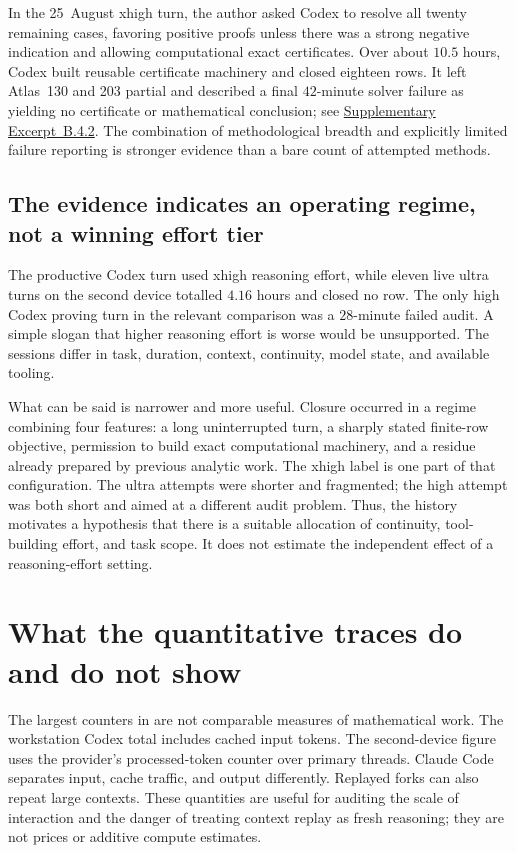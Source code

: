 \documentclass[11pt]{article}
\newcommand{\excerptlink}[2]{\hyperref[ex:#1]{Supplementary Excerpt~#2}}
\begin{document}
In the 25~August xhigh turn, the author asked Codex to resolve all twenty
remaining cases, favoring positive proofs unless there was a strong negative
indication and allowing computational exact certificates.  Over about
$10.5$ hours, Codex built reusable certificate machinery and closed eighteen
rows.  It left Atlas~130 and 203 partial and described a final $42$-minute
solver failure as yielding no certificate or mathematical conclusion; see
\excerptlink{B42}{B.4.2}.  The combination of methodological breadth and
explicitly limited failure reporting is stronger evidence than a bare count
of attempted methods.

\subsection{The evidence indicates an operating regime, not a winning effort tier}
\label{sec:effort}

The productive Codex turn used xhigh reasoning effort, while eleven live ultra
turns on the second device totalled $4.16$ hours and closed no row.  The only
high Codex proving turn in the relevant comparison was a $28$-minute failed
audit.  A simple slogan that higher reasoning effort is worse would be
unsupported.  The sessions differ in task, duration, context, continuity,
model state, and available tooling.

What can be said is narrower and more useful.  Closure occurred in a regime
combining four features: a long uninterrupted turn, a sharply stated
finite-row objective, permission to build exact computational machinery, and
a residue already prepared by previous analytic work.  The xhigh label is one
part of that configuration.  The ultra attempts were shorter and fragmented;
the high attempt was both short and aimed at a different audit problem.  Thus,
the history motivates a hypothesis that there is a suitable allocation of
continuity, tool-building effort, and task scope.  It does not estimate the
independent effect of a reasoning-effort setting.

\section{What the quantitative traces do and do not show}
\label{sec:quantitative}



The largest counters in  are not comparable
measures of mathematical work.  The workstation Codex total includes
\WorkstationCodexCached{} cached input tokens.  The second-device figure uses
the provider's processed-token counter over primary threads.  Claude Code
separates input, cache traffic, and output differently.  Replayed forks can
also repeat large contexts.  These quantities are useful for auditing the
scale of interaction and the danger of treating context replay as fresh
reasoning; they are not prices or additive compute estimates.
\end{document}
